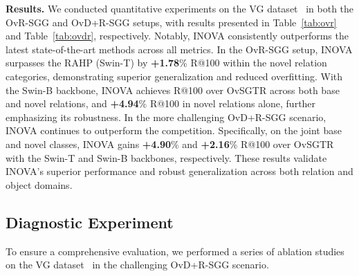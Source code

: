 \textbf{Results.}
We conducted quantitative experiments on the VG dataset~\cite{krishna2017visual} in both the OvR-SGG and OvD+R-SGG setups, with results presented in Table~\ref{tab:ovr} and Table~\ref{tab:ovdr}, respectively. Notably, INOVA consistently outperforms the latest state-of-the-art methods across all metrics. In the OvR-SGG setup, INOVA surpasses the RAHP (Swin-T) by \textbf{+1.78}\% R@100 within the novel relation categories, demonstrating superior generalization and reduced overfitting. With the Swin-B backbone, INOVA achieves R@100 over OvSGTR across both base and novel relations, and \textbf{+4.94}\% R@100 in novel relations alone, further emphasizing its robustness. In the more challenging OvD+R-SGG scenario, INOVA continues to outperform the competition. Specifically, on the joint base and novel classes, INOVA gains \textbf{+4.90}\% and \textbf{+2.16}\% R@100 over OvSGTR with the Swin-T and Swin-B backbones, respectively. These results validate INOVA's superior performance and robust generalization across both relation and object domains.

\subsection{Diagnostic Experiment}

To ensure a comprehensive evaluation, we performed a series of ablation studies on the VG dataset~\cite{krishna2017visual} in the challenging OvD+R-SGG scenario.



